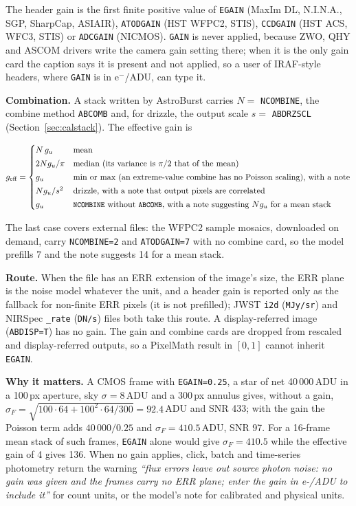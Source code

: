 \documentclass[11pt,a4paper]{article}
\newcommand{\code}[1]{\texttt{\small #1}}
\begin{document}
    The header gain is the first finite positive value of \code{EGAIN} (MaxIm DL, N.I.N.A., SGP, SharpCap, ASIAIR), \code{ATODGAIN} (HST WFPC2, STIS), \code{CCDGAIN} (HST ACS, WFC3, STIS) or \code{ADCGAIN} (NICMOS). \code{GAIN} is never applied, because ZWO, QHY and ASCOM drivers write the camera gain setting there; when it is the only gain card the caption says it is present and not applied, so a user of IRAF-style headers, where \code{GAIN} is in e$^-$/ADU, can type it.

    \textbf{Combination.} A stack written by AstroBurst carries $N = $ \code{NCOMBINE}, the combine method \code{ABCOMB} and, for drizzle, the output scale $s = $ \code{ABDRZSCL} (Section~\ref{sec:calstack}). The effective gain is

    \begin{equation}
        g_{\text{eff}} = \begin{cases}
            N \, g_u & \text{mean} \\[2pt]
            2 N g_u / \pi & \text{median (its variance is } \pi/2 \text{ that of the mean)} \\[2pt]
            g_u & \text{min or max (an extreme-value combine has no Poisson scaling), with a note} \\[2pt]
            N g_u / s^2 & \text{drizzle, with a note that output pixels are correlated} \\[2pt]
            g_u & \code{NCOMBINE} \text{ without } \code{ABCOMB}\text{, with a note suggesting } N g_u \text{ for a mean stack}
        \end{cases}
    \end{equation}

    The last case covers external files: the WFPC2 sample mosaics, downloaded on demand, carry \code{NCOMBINE=2} and \code{ATODGAIN=7} with no combine card, so the model prefills 7 and the note suggests 14 for a mean stack.

    \textbf{Route.} When the file has an ERR extension of the image's size, the ERR plane is the noise model whatever the unit, and a header gain is reported only as the fallback for non-finite ERR pixels (it is not prefilled); JWST \code{i2d} (\code{MJy/sr}) and NIRSpec \code{\_rate} (\code{DN/s}) files both take this route. A display-referred image (\code{ABDISP=T}) has no gain. The gain and combine cards are dropped from rescaled and display-referred outputs, so a PixelMath result in $[0,1]$ cannot inherit \code{EGAIN}.

    \textbf{Why it matters.} A CMOS frame with \code{EGAIN=0.25}, a star of net 40\,000\,ADU in a 100\,px aperture, sky $\sigma = 8$\,ADU and a 300\,px annulus gives, without a gain, $\sigma_F = \sqrt{100 \cdot 64 + 100^2 \cdot 64/300} = 92.4$\,ADU and SNR 433; with the gain the Poisson term adds $40\,000/0.25$ and $\sigma_F = 410.5$\,ADU, SNR 97. For a 16-frame mean stack of such frames, \code{EGAIN} alone would give $\sigma_F = 410.5$ while the effective gain of 4 gives 136. When no gain applies, click, batch and time-series photometry return the warning \emph{``flux errors leave out source photon noise: no gain was given and the frames carry no ERR plane; enter the gain in e-/ADU to include it''} for count units, or the model's note for calibrated and physical units.
\end{document}
